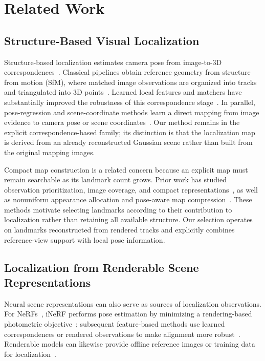 \section{Related Work}
\label{sec:related}

\subsection{Structure-Based Visual Localization}
Structure-based localization estimates camera pose from image-to-3D correspondences~\cite{hartley2004mvg,lepetit2009epnp,fischler1981ransac}. Classical pipelines obtain reference geometry from structure from motion (SfM), where matched image observations are organized into tracks and triangulated into 3D points~\cite{schonberger2016sfm}. Learned local features and matchers have substantially improved the robustness of this correspondence stage~\cite{detone2018superpoint,sarlin2020superglue,sarlin2019hloc}. In parallel, pose-regression and scene-coordinate methods learn a direct mapping from image evidence to camera pose or scene coordinates~\cite{kendall2015posenet,shotton2013scenes,brachmann2021dsacstar,brachmann2023ace,reported260504730v1bibbib37}. Our method remains in the explicit correspondence-based family; its distinction is that the localization map is derived from an already reconstructed Gaussian scene rather than built from the original mapping images.

Compact map construction is a related concern because an explicit map must remain searchable as its landmark count grows. Prior work has studied observation prioritization, image coverage, and compact representations~\cite{li2010prioritized,cao2014minimal,dymczyk2015gist}, as well as nonuniform appearance allocation and pose-aware map compression~\cite{camposeco2019hybrid,yang2022scenesqueezer}. These methods motivate selecting landmarks according to their contribution to localization rather than retaining all available structure. Our selection operates on landmarks reconstructed from rendered tracks and explicitly combines reference-view support with local pose information.

\subsection{Localization from Renderable Scene Representations}
Neural scene representations can also serve as sources of localization observations. For NeRFs~\cite{mildenhall2020nerf}, iNeRF performs pose estimation by minimizing a rendering-based photometric objective~\cite{yenchen2021inerf}; subsequent feature-based methods use learned correspondences or rendered observations to make alignment more robust~\cite{reported260504730v1bibbib42,reported260504730v1bibbib27,zhou2024nerfmatch,reported250319358v1bibbib68,reported260504730v1bibbib57}. Renderable models can likewise provide offline reference images or training data for localization~\cite{reported260504730v1bibbib56,reported260504730v1bibbib29,reported260504730v1bibbib8}.

